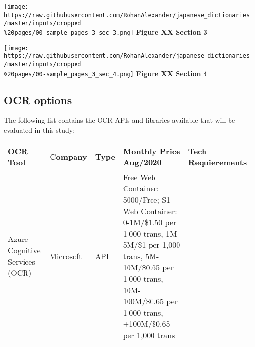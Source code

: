 \documentclass[
]{article}
\begin{document}
\texttt{[image: https://raw.githubusercontent.com/RohanAlexander/japanese\_dictionaries/master/inputs/cropped\\\%20pages/00-sample\_pages\_3\_sec\_3.png]}
\textbf{Figure XX Section 3}

\texttt{[image: https://raw.githubusercontent.com/RohanAlexander/japanese\_dictionaries/master/inputs/cropped\\\%20pages/00-sample\_pages\_3\_sec\_4.png]}
\textbf{Figure XX Section 4}

\hypertarget{ocr-options}{%
\subsection{OCR options}\label{ocr-options}}

The following list contains the OCR APIs and libraries available that
will be evaluated in this study:

\begin{longtable}[]{@{}lllll@{}}
\toprule
\begin{minipage}[b]{0.37\columnwidth}\raggedright
OCR Tool\strut
\end{minipage} & \begin{minipage}[b]{0.09\columnwidth}\raggedright
Company\strut
\end{minipage} & \begin{minipage}[b]{0.14\columnwidth}\raggedright
Type\strut
\end{minipage} & \begin{minipage}[b]{0.07\columnwidth}\raggedright
Monthly Price Aug/2020\strut
\end{minipage} & \begin{minipage}[b]{0.18\columnwidth}\raggedright
Tech Requierements\strut
\end{minipage}\tabularnewline
\midrule
\endhead
\begin{minipage}[t]{0.37\columnwidth}\raggedright
Azure Cognitive Services (OCR)\strut
\end{minipage} & \begin{minipage}[t]{0.09\columnwidth}\raggedright
Microsoft\strut
\end{minipage} & \begin{minipage}[t]{0.14\columnwidth}\raggedright
API\strut
\end{minipage} & \begin{minipage}[t]{0.07\columnwidth}\raggedright
Free Web Container: 5000/Free; S1 Web Container: 0-1M/\$1.50 per 1,000
trans, 1M-5M/\$1 per 1,000 trans, 5M-10M/\$0.65 per 1,000 trans,
10M-100M/\$0.65 per 1,000 trans, +100M/\$0.65 per 1,000 trans\strut
\end{minipage} & \begin{minipage}[t]{0.18\columnwidth}\raggedright

\end{minipage}
\end{longtable}
\end{document}
